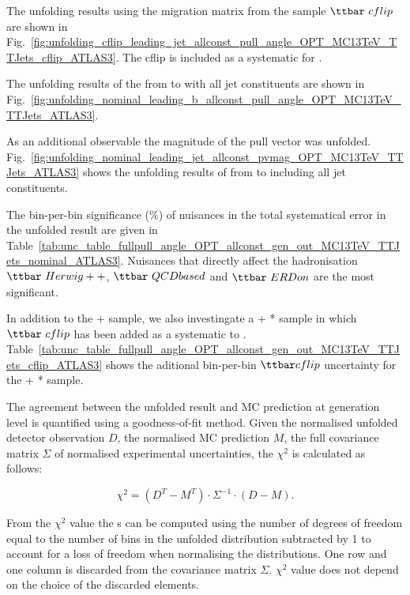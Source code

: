 The unfolding results using the migration matrix from the sample $\ttbar\ cflip$ are shown in Fig.~\ref{fig:unfolding_cflip_leading_jet_allconst_pull_angle_OPT_MC13TeV_TTJets_cflip_ATLAS3}. The \ttbar cflip is included as a systematic for \ttbar.

The unfolding results of the \pullangle from \leadingb to \scndleadingb with all jet constituents are shown in Fig.~\ref{fig:unfolding_nominal_leading_b_allconst_pull_angle_OPT_MC13TeV_TTJets_ATLAS3}.

As an additional observable the magnitude of the pull vector \pvmag was unfolded. Fig.~\ref{fig:unfolding_nominal_leading_jet_allconst_pvmag_OPT_MC13TeV_TTJets_ATLAS3} shows the unfolding results of \pvmag from \leadingjet to \scndleadingjet including all jet constituents.

The bin-per-bin significance (\%) of nuisances in the total systematical error in the unfolded result are given in Table~\ref{tab:unc_table_fullpull_angle_OPT_allconst_gen_out_MC13TeV_TTJets_nominal_ATLAS3}. Nuisances that directly affect the hadronisation $\ttbar\ Herwig++$, $\ttbar\ QCDbased$ and $\ttbar\ ERDon$ are the most significant.

In addition to the \POWHEG+ sample, we also investingate a \POWHEG+ * sample in which $\ttbar\ cflip$ has been added as a systematic to \ttbar. Table~\ref{tab:unc_table_fullpull_angle_OPT_allconst_gen_out_MC13TeV_TTJets_cflip_ATLAS3} shows the aditional bin-per-bin $\ttbar cflip$ uncertainty for the \POWHEG+ * sample.

The agreement between the unfolded result and MC prediction at generation level is quantified using a goodness-of-fit method. Given the normalised unfolded detector observation $D$, the normalised MC prediction $M$, the full covariance matrix $\Sigma$ of normalised experimental uncertainties, the $\chi^{2}$ is calculated as follows:

\begin{equation}
  \chi^{2}=(D^{T}-M^{T})\cdot\Sigma^{-1}\cdot(D-M).
  \label{eq:chi2}
\end{equation}

From the $\chi^{2}$ value the \pval s can be computed using the number of degrees of freedom equal to the number of bins in the unfolded distribution subtracted by 1 to account for a loss of freedom when normalising the distributions. One row and one column is discarded from the covariance matrix $\Sigma$. $\chi^{2}$ value does not depend on the choice of the discarded elements.

